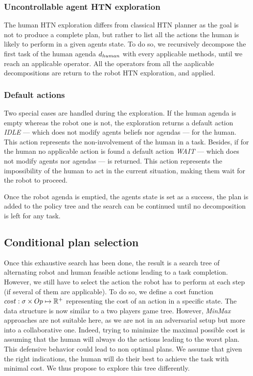 \documentclass[a4paper,11pt,twoside]{StyleThese}
\begin{document}
\subsubsection{Uncontrollable agent HTN exploration}
The human HTN exploration differs from classical HTN planner as the goal is not to produce a complete plan, but rather to list all the actions the human is likely to perform in a given agents state. To do so, we recursively decompose the first task of the human agenda $d_{human}$ with every applicable methods, until we reach an applicable operator. All the operators from all the aaplicable decompositions are return to the robot HTN exploration, and applied.

\subsubsection{Default actions} Two special cases are handled during the exploration. If the human agenda is empty whereas the robot one is not, the exploration returns a default action \textit{IDLE} --- which does not modify agents beliefs nor agendas --- for the human. This action represents the non-involvement of the human in a task. Besides, if for the human no applicable action is found a default action \textit{WAIT} --- which does not modify agents nor agendas --- is returned. This action represents the impossibility of the human to act in the current situation, making them wait for the robot to proceed.

Once the robot agenda is emptied, the agents state is set as a success, the plan is added to the policy tree and the search can be continued until no decomposition is left for any task.


\subsection{Conditional plan selection}
Once this exhaustive search has been done, the result is a search tree of alternating robot and human feasible actions leading to a task completion. However, we still have to select the action the robot has to perform at each step (if several of them are applicable). To do so, we define a cost function $cost: \sigma \times Op \mapsto \mathbb{R}^+$ representing the cost of an action in a specific state. The data structure is now similar to a two players game tree. However, \textit{MinMax} approaches are not suitable here, as we are not in an adversarial setup but more into a collaborative one. Indeed, trying to minimize the maximal possible cost is assuming that the human will always do the actions leading to the worst plan. This defensive behavior could lead to non optimal plans. We assume that given the right indications, the human will do their best to achieve the task with minimal cost. We thus propose to explore this tree differently.
\end{document}
